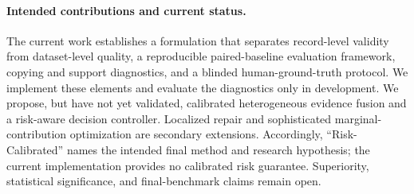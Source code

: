\paragraph{Intended contributions and current status.}
The current work establishes a formulation that separates record-level
validity from dataset-level quality, a reproducible paired-baseline evaluation
framework, copying and support diagnostics, and a blinded human-ground-truth
protocol. We implement these elements and evaluate the diagnostics only in
development. We propose, but have not yet validated, calibrated heterogeneous
evidence fusion and a risk-aware decision controller. Localized repair and
sophisticated marginal-contribution optimization are secondary extensions.
Accordingly, ``Risk-Calibrated'' names the intended final method and research
hypothesis; the current implementation provides no calibrated risk guarantee.
Superiority, statistical significance, and final-benchmark claims remain
open.
